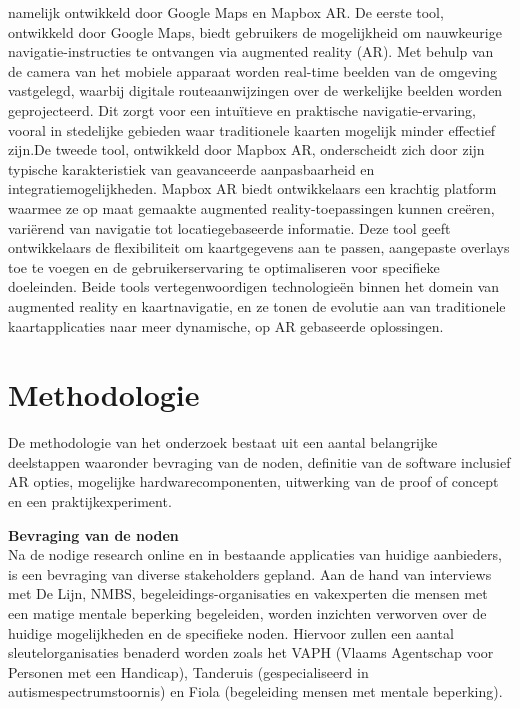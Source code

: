 \documentclass{hogent-article}
\begin{document}
namelijk ontwikkeld door Google Maps en Mapbox AR. De eerste tool, ontwikkeld door Google Maps, biedt gebruikers de mogelijkheid om nauwkeurige navigatie-instructies te ontvangen via augmented reality (AR). Met behulp van de camera van het mobiele apparaat worden real-time beelden van de omgeving vastgelegd, waarbij digitale routeaanwijzingen over de werkelijke beelden worden geprojecteerd. Dit zorgt voor een intuïtieve en praktische navigatie-ervaring, vooral in stedelijke gebieden waar traditionele kaarten mogelijk minder effectief zijn.De tweede tool, ontwikkeld door Mapbox AR, onderscheidt zich door zijn typische karakteristiek van geavanceerde aanpasbaarheid en integratiemogelijkheden. Mapbox AR biedt ontwikkelaars een krachtig platform waarmee ze op maat gemaakte augmented reality-toepassingen kunnen creëren, variërend van navigatie tot locatiegebaseerde informatie. Deze tool geeft ontwikkelaars de flexibiliteit om kaartgegevens aan te passen, aangepaste overlays toe te voegen en de gebruikerservaring te optimaliseren voor specifieke doeleinden. Beide tools vertegenwoordigen technologieën binnen het domein van augmented reality en kaartnavigatie, en ze tonen de evolutie aan van traditionele kaartapplicaties naar meer dynamische, op AR gebaseerde oplossingen.
    

    
    \section{Methodologie}%
   
    De methodologie van het onderzoek bestaat uit een aantal belangrijke deelstappen waaronder bevraging van de noden, definitie van de software inclusief AR opties, mogelijke hardwarecomponenten, uitwerking van de proof of concept en een praktijkexperiment.
    
    \textbf{Bevraging van de noden} \\
    
    Na de nodige research online en in bestaande applicaties van huidige aanbieders, is een bevraging van diverse stakeholders gepland. Aan de hand van interviews met De Lijn, NMBS, begeleidings-organisaties en vakexperten die mensen met een matige mentale beperking begeleiden, worden inzichten verworven over de huidige mogelijkheden en de specifieke noden. Hiervoor zullen een aantal sleutelorganisaties benaderd worden zoals het VAPH (Vlaams Agentschap voor Personen met een Handicap), Tanderuis (gespecialiseerd in autismespectrumstoornis) en Fiola (begeleiding mensen met mentale beperking).
    
\end{document}
